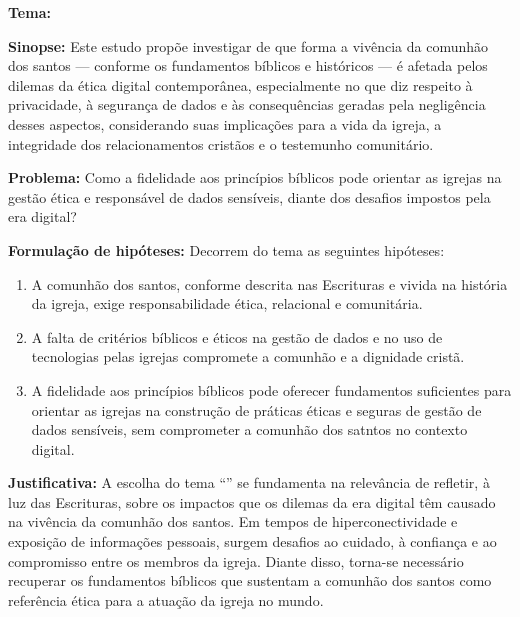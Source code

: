 \documentclass[12pt,a4paper]{article}
\renewcommand{\baselinestretch}{1.5}
\begin{document}






\newpage
\pagestyle{plain}
\renewcommand{\baselinestretch}{1.5}
\normalsize
\noindent
\textbf{Tema:} \tema

\noindent
\textbf{Sinopse:} Este estudo propõe investigar de que forma a vivência da comunhão dos santos — conforme os fundamentos bíblicos e históricos — é afetada pelos dilemas da ética digital contemporânea, especialmente no que diz respeito à privacidade, à segurança de dados e às consequências geradas pela negligência desses aspectos, considerando suas implicações para a vida da igreja, a integridade dos relacionamentos cristãos e o testemunho comunitário.

\noindent
\textbf{Problema:} Como a fidelidade aos princípios bíblicos pode orientar as igrejas na gestão ética e responsável de dados sensíveis, diante dos desafios impostos pela era digital?

\noindent
\textbf{Formulação de hipóteses:}
Decorrem do tema as seguintes hipóteses:
\begin{enumerate}
    \item A comunhão dos santos, conforme descrita nas Escrituras e vivida na história da igreja, exige responsabilidade ética, relacional e comunitária.
    \item A falta de critérios bíblicos e éticos na gestão de dados e no uso de tecnologias pelas igrejas compromete a comunhão e a dignidade cristã.
    \item A fidelidade aos princípios bíblicos pode oferecer fundamentos suficientes para orientar as igrejas na construção de práticas éticas e seguras de gestão de dados sensíveis, sem comprometer a comunhão dos satntos no contexto digital.
\end{enumerate}

\noindent
\textbf{Justificativa:} A escolha do tema ``\tema'' se fundamenta na relevância de refletir, à luz das Escrituras, sobre os impactos que os dilemas da era digital têm causado na vivência da comunhão dos santos. Em tempos de hiperconectividade e exposição de informações pessoais, surgem desafios ao cuidado, à confiança e ao compromisso entre os membros da igreja. Diante disso, torna-se necessário recuperar os fundamentos bíblicos que sustentam a comunhão dos santos como referência ética para a atuação da igreja no mundo.
\end{document}

